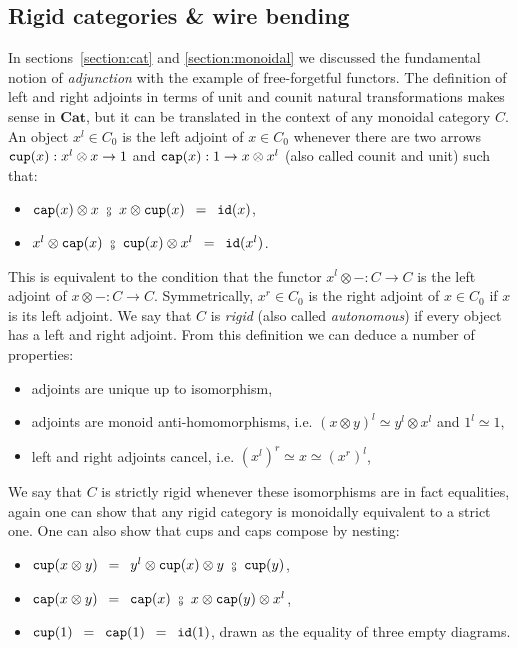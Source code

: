 
\subsection{Rigid categories \& wire bending} \label{subsection:rigid}

In sections~\ref{section:cat} and \ref{section:monoidal} we discussed the fundamental notion of \emph{adjunction} with the example of free-forgetful functors.
The definition of left and right adjoints in terms of unit and counit natural transformations makes sense in $\mathbf{Cat}$, but it can be translated in the context of any monoidal category $C$.
An object $x^l \in C_0$ is the left adjoint of $x \in C_0$ whenever there are two arrows $\mathtt{cup}(x) : x^l \otimes x \to 1$ and $\mathtt{cap}(x) : 1 \to x \otimes x^l$ (also called counit and unit) such that:
\begin{itemize}
\item $\ttcap(x) \otimes x \ \fcmp \ x \otimes \ttcup(x) \s = \s \id(x)$,
\item $x^l \otimes \ttcap(x) \ \fcmp \ \ttcup(x) \otimes x^l \s = \s \id(x^l)$.
\end{itemize}
This is equivalent to the condition that the functor $x^l \otimes - : C \to C$ is the left adjoint of $x \otimes - : C \to C$.
Symmetrically, $x^r \in C_0$ is the right adjoint of $x \in C_0$ if $x$ is its left adjoint.
We say that $C$ is \emph{rigid} (also called \emph{autonomous}) if every object has a left and right adjoint.
From this definition we can deduce a number of properties:
\begin{itemize}
    \item adjoints are unique up to isomorphism,
    \item adjoints are monoid anti-homomorphisms, i.e. $(x \otimes y)^l \simeq y^l \otimes x^l$ and $1^l \simeq 1$,
    \item left and right adjoints cancel, i.e. $(x^l)^r \simeq x \simeq (x^r)^l$,
\end{itemize}
We say that $C$ is strictly rigid whenever these isomorphisms are in fact equalities, again one can show that any rigid category is monoidally equivalent to a strict one.
One can also show that cups and caps compose by nesting:
\begin{itemize}
\item $\ttcup(x \otimes y) \s = \s y^l \otimes \ttcup(x) \otimes y \ \fcmp \ \ttcup(y)$,
\item $\ttcap(x \otimes y) \s = \s \ttcap(x) \ \fcmp \ x \otimes \ttcap(y) \otimes x^l$,
\item $\mathtt{cup}(1) \enspace = \enspace \mathtt{cap}(1) \enspace = \enspace \mathtt{id}(1)$, drawn as the equality of three empty diagrams.
\end{itemize}
